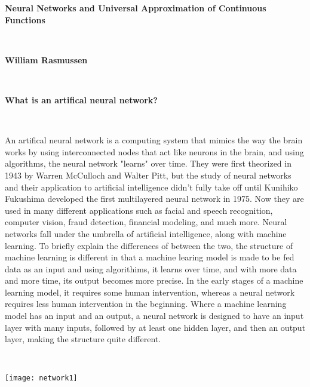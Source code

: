 \documentclass[12 pt]{article}
\theoremstyle{definition}
\begin{document}
\begin{center}
  \textbf{Neural Networks and Universal Approximation of Continuous Functions}
\end{center}

\

\begin{center}
 \textbf{William Rasmussen}
\end{center}

\

\textbf{What is an artifical neural network?}

\

An artifical neural network is a computing system that mimics the way the brain works by using interconnected nodes that act like neurons in the brain, and using algorithms, the neural network "learns" over time. They were first theorized in 1943 by Warren McCulloch and Walter Pitt, but the study of neural networks and their application to artificial intelligence didn't fully take off until Kunihiko Fukushima developed the first multilayered neural network in 1975. Now they are used in many different applications such as facial and speech recognition, computer vision, fraud detection, financial modeling, and much more. Neural networks fall under the umbrella of artificial intelligence, along with machine learning. To briefly explain the differences of between the two, the structure of machine learning is different in that a machine learing model is made to be fed data as an input and using algorithims, it learns over time, and with more data and more time, its output becomes more precise. In the early stages of a machine learning model, it requires some human intervention, whereas a neural network requires less human intervention in the beginning. Where a machine learning model has an input and an output, a neural network is designed to have an input layer with many inputs, followed by at least one hidden layer, and then an output layer, making the structure quite different. 

\

\texttt{[image: network1]}

\
\end{document}
